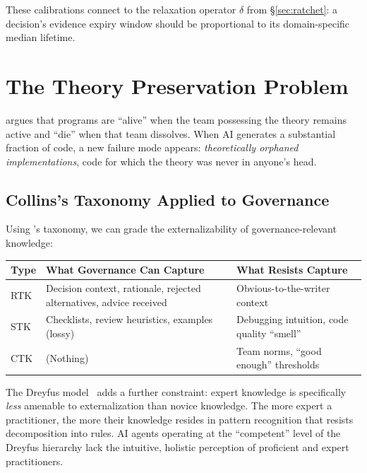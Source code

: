 \documentclass[11pt, a4paper, logo, copyright]{googledeepmind}
\begin{document}
These calibrations connect to the relaxation operator $\delta$ from \S\ref{sec:ratchet}: a decision's evidence expiry window should be proportional to its domain-specific median lifetime.


\section{The Theory Preservation Problem}
\label{sec:theory}

\citet{naur1985} argues that programs are ``alive'' when the team possessing the theory remains active and ``die'' when that team dissolves. When AI generates a substantial fraction of code, a new failure mode appears: \emph{theoretically orphaned implementations}, code for which the theory was never in anyone's head.

\subsection{Collins's Taxonomy Applied to Governance}

Using \citet{collins2010}'s taxonomy, we can grade the externalizability of governance-relevant knowledge:

\begin{center}
\begin{tabular}{lp{5cm}p{5cm}}
\toprule
Type & What Governance Can Capture & What Resists Capture \\
\midrule
RTK & Decision context, rationale, rejected alternatives, advice received & Obvious-to-the-writer context \\
STK & Checklists, review heuristics, examples (lossy) & Debugging intuition, code quality ``smell'' \\
CTK & (Nothing) & Team norms, ``good enough'' thresholds \\
\bottomrule
\end{tabular}
\end{center}

The Dreyfus model~\citep{dreyfus1986} adds a further constraint: expert knowledge is specifically \emph{less} amenable to externalization than novice knowledge. The more expert a practitioner, the more their knowledge resides in pattern recognition that resists decomposition into rules. AI agents operating at the ``competent'' level of the Dreyfus hierarchy lack the intuitive, holistic perception of proficient and expert practitioners.
\end{document}
